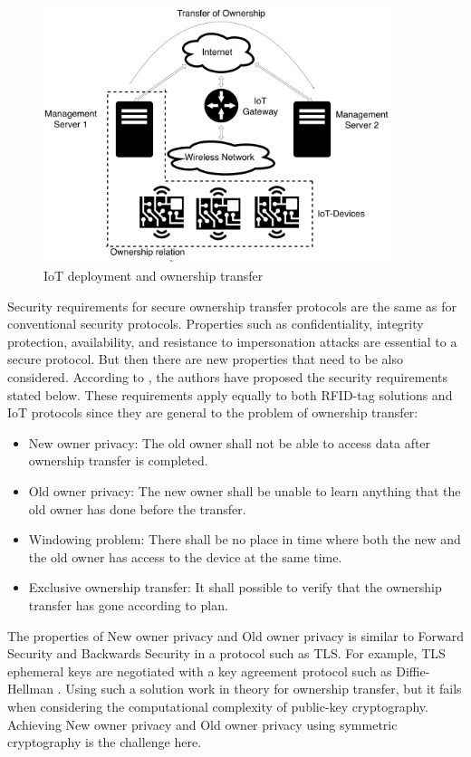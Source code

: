 \begin{figure}[h]
\centering
\includegraphics[width=0.9\textwidth]{images/IoT_OT.pdf}
\caption{IoT deployment and ownership transfer}
\label{fig:iot-ot}
\end{figure}


Security requirements for secure ownership transfer protocols are the same as for conventional security protocols. Properties such as confidentiality, integrity protection, availability, and resistance to impersonation attacks are essential to a secure protocol. But then there are new properties that need to be also considered. According to \cite{taqieddin2018tag}, the authors have proposed the security requirements stated below. These requirements apply equally to both RFID-tag solutions and IoT protocols since they are general to the problem of ownership transfer:
\begin{itemize}
    \item New owner privacy: The old owner shall not be able to access data after ownership transfer is completed.
    \item Old owner privacy: The new owner shall be unable to learn anything that the old owner has done before the transfer.
    \item Windowing problem: There shall be no place in time where both the new and the old owner has access to the device at the same time.
    \item Exclusive ownership transfer: It shall possible to verify that the ownership transfer has gone according to plan.
\end{itemize}
The properties of New owner privacy and Old owner privacy is similar to Forward Security and Backwards Security in a protocol such as TLS. For example, TLS ephemeral keys are negotiated with a key agreement protocol such as Diffie-Hellman \cite{diffie1976new}. Using such a solution work in theory for ownership transfer, but it fails when considering the computational complexity of public-key cryptography. Achieving New owner privacy and Old owner privacy using symmetric cryptography is the challenge here. 


